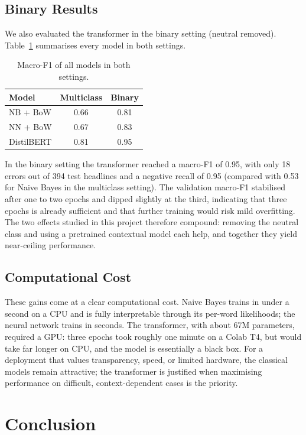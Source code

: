 \documentclass[sigconf,nonacm]{acmart}
\begin{document}
\subsection{Binary Results}

We also evaluated the transformer in the binary setting (neutral removed). Table~\ref{tab:transformer-all} summarises every model in both settings.

\begin{table}[t]
\centering
\caption{Macro-F1 of all models in both settings.}
\label{tab:transformer-all}
\begin{tabular}{lcc}
\toprule
Model & Multiclass & Binary \\
\midrule
NB + BoW   & 0.66 & 0.81 \\
NN + BoW   & 0.67 & 0.83 \\
DistilBERT & 0.81 & 0.95 \\
\bottomrule
\end{tabular}
\end{table}

In the binary setting the transformer reached a macro-F1 of 0.95, with only 18 errors out of 394 test headlines and a negative recall of 0.95 (compared with 0.53 for Naive Bayes in the multiclass setting). The validation macro-F1 stabilised after one to two epochs and dipped slightly at the third, indicating that three epochs is already sufficient and that further training would risk mild overfitting. The two effects studied in this project therefore compound: removing the neutral class and using a pretrained contextual model each help, and together they yield near-ceiling performance.

\subsection{Computational Cost}

These gains come at a clear computational cost. Naive Bayes trains in under a second on a CPU and is fully interpretable through its per-word likelihoods; the neural network trains in seconds. The transformer, with about 67M parameters, required a GPU: three epochs took roughly one minute on a Colab T4, but would take far longer on CPU, and the model is essentially a black box. For a deployment that values transparency, speed, or limited hardware, the classical models remain attractive; the transformer is justified when maximising performance on difficult, context-dependent cases is the priority.

\section{Conclusion}
\end{document}
